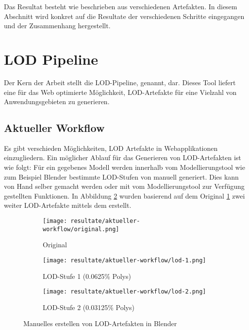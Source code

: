 Das Resultat besteht wie beschrieben aus verschiedenen Artefakten. In diesem Abschnitt wird konkret auf die Resultate der verschiedenen Schritte eingegangen und der Zusammenhang hergestellt.

\section{LOD Pipeline}

Der Kern der Arbeit stellt die LOD-Pipeline,  genannt, dar. Dieses Tool liefert eine für das Web optimierte Möglichkeit, LOD-Artefakte für eine Vielzahl von Anwendungsgebieten zu generieren.

\subsection{Aktueller Workflow}

Es gibt verschieden Möglichkeiten, LOD Artefakte in Webapplikationen einzugliedern. Ein möglicher Ablauf für das Generieren von LOD-Artefakten ist wie folgt:
Für ein gegebenes Modell werden innerhalb vom Modellierungstool wie zum Beispiel Blender bestimmte LOD-Stufen von manuell generiert. Dies kann von Hand selber gemacht werden oder mit vom Modellierungstool zur Verfügung gestellten Funktionen. In Abbildung \ref{fig:manualLodGenerationInBlender} wurden basierend auf dem Original \ref{fig:manualLodGenerationInBlenderOriginal} zwei weiter LOD-Artefakte mittels dem  erstellt.

\begin{figure}[H]
  \centering
  \begin{subfigure}{.6\textwidth}
    \centering
    \texttt{[image: resultate/aktueller-workflow/original.png]}
    \caption{Original}
    \label{fig:manualLodGenerationInBlenderOriginal}
  \end{subfigure}
  \begin{subfigure}{.6\textwidth}
    \centering
    \texttt{[image: resultate/aktueller-workflow/lod-1.png]}
    \caption{LOD-Stufe 1 (0.0625\% Polys)}
  \end{subfigure}
  \begin{subfigure}{.6\textwidth}
    \centering
    \texttt{[image: resultate/aktueller-workflow/lod-2.png]}
    \caption{LOD-Stufe 2 (0.03125\% Polys)}
  \end{subfigure}
  \caption{Manuelles erstellen von LOD-Artefakten in Blender}
  \label{fig:manualLodGenerationInBlender}
\end{figure}

